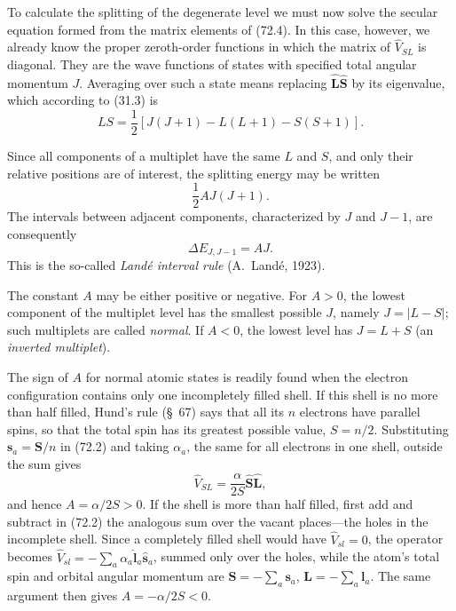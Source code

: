 To calculate the splitting of the degenerate level we must now solve the secular equation formed from the matrix elements of (72.4). In this case, however, we already know the proper zeroth-order functions in which the matrix of $\hat V_{SL}$ is diagonal. They are the wave functions of states with specified total angular momentum $J$. Averaging over such a state means replacing $\hat{\mathbf L}\hat{\mathbf S}$ by its eigenvalue, which according to (31.3) is
\[
 LS=\frac12[J(J+1)-L(L+1)-S(S+1)].
\]

Since all components of a multiplet have the same $L$ and $S$, and only their relative positions are of interest, the splitting energy may be written
\begin{equation}
 \frac12AJ(J+1).
 \tag{72.5}
\end{equation}
The intervals between adjacent components, characterized by $J$ and $J-1$, are consequently
\begin{equation}
 \Delta E_{J,J-1}=AJ.
 \tag{72.6}
\end{equation}
This is the so-called \emph{Land\'e interval rule} (A.~Land\'e, 1923).

The constant $A$ may be either positive or negative. For $A>0$, the lowest component of the multiplet level has the smallest possible $J$, namely $J=|L-S|$; such multiplets are called \emph{normal}. If $A<0$, the lowest level has $J=L+S$ (an \emph{inverted multiplet}).

The sign of $A$ for normal atomic states is readily found when the electron configuration contains only one incompletely filled shell. If this shell is no more than half filled, Hund's rule (\S~67) says that all its $n$ electrons have parallel spins, so that the total spin has its greatest possible value, $S=n/2$. Substituting $\mathbf s_a=\mathbf S/n$ in (72.2) and taking $\alpha_a$, the same for all electrons in one shell, outside the sum gives
\[
 \hat V_{SL}=\frac{\alpha}{2S}\hat{\mathbf S}\hat{\mathbf L},
\]
and hence $A=\alpha/2S>0$. If the shell is more than half filled, first add and subtract in (72.2) the analogous sum over the vacant places---the holes in the incomplete shell. Since a completely filled shell would have $\hat V_{sl}=0$, the operator becomes $\hat V_{sl}=-\sum_a\alpha_a\hat{\mathbf l}_a\hat{\mathbf s}_a$, summed only over the holes, while the atom's total spin and orbital angular momentum are $\mathbf S=-\sum_a\mathbf s_a$, $\mathbf L=-\sum_a\mathbf l_a$. The same argument then gives $A=-\alpha/2S<0$.

